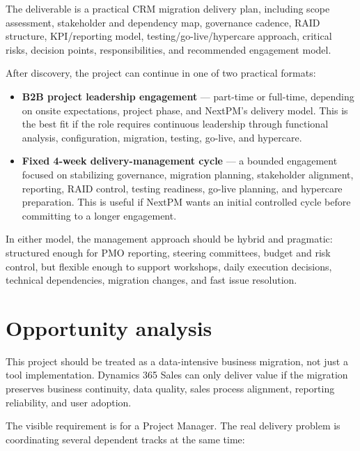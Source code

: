 \documentclass[11pt,a4paper]{article}
\begin{document}
The deliverable is a practical CRM migration delivery plan, including scope assessment, stakeholder and dependency map, governance cadence, RAID structure, KPI/reporting model, testing/go-live/hypercare approach, critical risks, decision points, responsibilities, and recommended engagement model.\par

After discovery, the project can continue in one of two practical formats:\par

\begin{itemize}
\item \textbf{B2B project leadership engagement} --- part-time or full-time, depending on onsite expectations, project phase, and NextPM's delivery model. This is the best fit if the role requires continuous leadership through functional analysis, configuration, migration, testing, go-live, and hypercare.
\item \textbf{Fixed 4-week delivery-management cycle} --- a bounded engagement focused on stabilizing governance, migration planning, stakeholder alignment, reporting, RAID control, testing readiness, go-live planning, and hypercare preparation. This is useful if NextPM wants an initial controlled cycle before committing to a longer engagement.
\end{itemize}

In either model, the management approach should be hybrid and pragmatic: structured enough for PMO reporting, steering committees, budget and risk control, but flexible enough to support workshops, daily execution decisions, technical dependencies, migration changes, and fast issue resolution.\par

\section*{Opportunity analysis}

This project should be treated as a data-intensive business migration, not just a tool implementation. Dynamics 365 Sales can only deliver value if the migration preserves business continuity, data quality, sales process alignment, reporting reliability, and user adoption.\par

The visible requirement is for a Project Manager. The real delivery problem is coordinating several dependent tracks at the same time:\par
\end{document}
